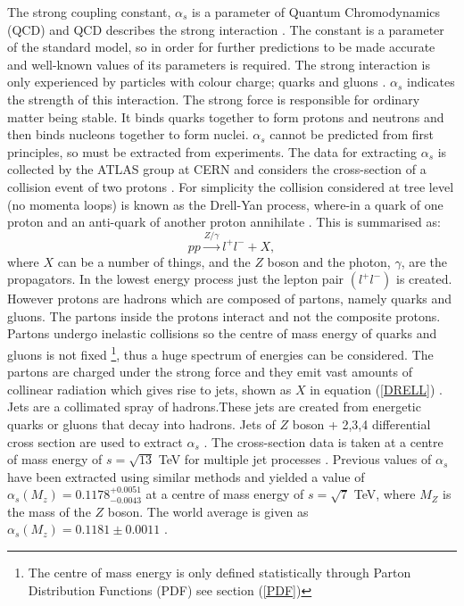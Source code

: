 \documentclass[12pt, onecolumn, nofootinbib]{revtex4}    %
\begin{document}
The strong coupling constant, ${\alpha_s}$ is a parameter of Quantum Chromodynamics (QCD) and QCD describes the strong interaction \cite{DMP}.  The constant is a parameter of the standard model, so in order for further predictions to be made accurate and well-known values of its parameters is required. The strong interaction is only experienced by particles with colour charge; quarks and gluons \cite{PPB}. ${\alpha_s}$ indicates the strength of this interaction. The strong force is responsible for ordinary matter being stable. It binds quarks together to form protons and neutrons and then binds nucleons together to form nuclei. ${\alpha_s}$ cannot be predicted from first principles, so must be extracted from experiments.  The data for extracting ${\alpha _s}$ is collected by the ATLAS group at CERN and considers the cross-section of a collision event of two protons \cite{HEPD}. For simplicity the collision considered at tree level (no momenta loops) is known as the Drell-Yan process, where-in a quark of one proton and an anti-quark of another proton annihilate \cite{BOOK}. This is summarised as: \begin{equation} \label{DRELL} pp \xrightarrow{Z/\gamma}  l^+l^- + X, \end{equation} where ${X}$ can be a number of things, and the ${Z}$ boson and the photon, ${\gamma}$, are the propagators. In the lowest energy process just the lepton pair ${(l^+l^-)}$ is created. However protons are hadrons which are composed of partons, namely quarks and gluons. The partons inside the protons  interact and not the composite protons. Partons undergo inelastic collisions so the centre of mass energy of quarks and gluons is not fixed \footnote{The centre of mass energy is only defined statistically through Parton Distribution Functions (PDF) see section (\ref{PDF})}, thus a huge spectrum of energies can be considered.  The partons are charged under the strong force and they emit vast amounts of collinear radiation which gives rise to jets, shown as ${X}$ in equation (\ref{DRELL}) \cite{PHD}. Jets are a collimated spray of hadrons.These jets are  created from energetic quarks or gluons that decay into hadrons. Jets of ${Z}$ boson + 2,3,4 differential cross section are used to extract ${\alpha _s}$ \cite{HEPP}. The cross-section data is taken at a centre of mass  energy of ${s = \sqrt{13}}$ TeV for multiple jet processes \cite{HEPP}. Previous values of ${\alpha _s}$ have been extracted using similar methods and yielded a value of ${\alpha _s(M_z) = 0.1178^{+0.0051}_{-0.0043}}$ at a centre of mass energy of ${s=\sqrt{7}}$  TeV, where ${M_Z}$ is the mass of the ${Z}$ boson. The world average is given as ${\alpha _s(M_z) = 0.1181 \pm 0.0011}$ \cite{PPB}. 
\end{document}
